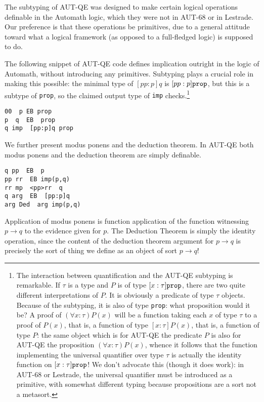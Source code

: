 \documentclass{article}
\begin{document}
The subtyping of AUT-QE was designed to make certain logical operations definable in the Automath logic, which they were not in AUT-68 or in Lestrade.
Our preference is that these operations be primitives, due to a general attitude toward what a logical framework (as opposed to a full-fledged logic) is supposed to do.

The following snippet of AUT-QE code defines implication outright in the logic of Automath, without introducing any primitives.  Subtyping plays a crucial role in making this possible:  the minimal type of $[pp:p]q$ is $[pp:p]{\tt prop}$, but this is a subtype of {\tt prop}, so the claimed output  type of {\tt imp} checks.\footnote{The interaction between quantification and the AUT-QE subtyping is remarkable.  If $\tau$ is a type and $P$ is of type $[x:\tau]{\tt prop}$, there are two quite different interpretations of $P$.  It is obviously a predicate of type $\tau$ objects.  Because of the subtyping, it is also of type {\tt prop}:  what proposition would it be?  A proof of $(\forall x:\tau)P(x)$ will be a function taking each $x$ of type $\tau$ to a proof of $P(x)$, that is, a function of type $[x:\tau]P(x)$, that is, a function of type $P$:  the same object which is for AUT-QE the predicate $P$ is also for AUT-QE the proposition $(\forall x:\tau)P(x)$, whence it follows that the function implementing the universal quantifier over type $\tau$ is actually the identity function on $[x:\tau]{\tt prop}$!  We don't advocate this (though it does work):  in AUT-68 or Lestrade, the universal quantifier must be introduced as a primitive, with somewhat different typing because propositions are a sort not a metasort.}

   \begin{verbatim}
00  p EB prop
p  q  EB  prop
q imp  [pp:p]q prop
\end{verbatim}



We further present modus ponens and the deduction theorem. In AUT-QE
both modus ponens and the deduction theorem are simply definable.

   \begin{verbatim}
q pp  EB  p
pp rr  EB imp(p,q)
rr mp  <pp>rr  q
q arg  EB  [pp:p]q
arg Ded  arg imp(p,q)
\end{verbatim}

Application of modus ponens is function application of the function witnessing $p \rightarrow q$ to the evidence given for $p$.  The Deduction Theorem is simply the identity operation, since the content of the deduction theorem argument for $p \rightarrow q$ is precisely the sort of thing we define as an object of sort $p \rightarrow q$!
\end{document}
